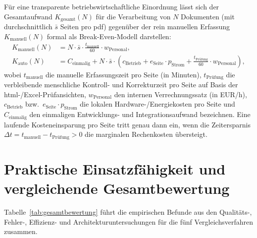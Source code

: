 Für eine transparente betriebswirtschaftliche Einordnung lässt sich der Gesamtaufwand $K_{\text{gesamt}}(N)$ für die Verarbeitung von $N$ Dokumenten (mit durchschnittlich $\bar{s}$ Seiten pro \ac{pdf}) gegenüber der rein manuellen Erfassung $K_{\text{manuell}}(N)$ formal als Break-Even-Modell darstellen:
\begin{align}
  K_{\text{manuell}}(N) &= N \cdot \bar{s} \cdot \frac{t_{\text{manuell}}}{60} \cdot w_{\text{Personal}}, \label{eq:kosten-manuell} \\
  K_{\text{auto}}(N) &= C_{\text{einmalig}} + N \cdot \bar{s} \cdot \left( c_{\text{Betrieb}} + e_{\text{Seite}} \cdot p_{\text{Strom}} + \frac{t_{\text{Prüfung}}}{60} \cdot w_{\text{Personal}} \right), \label{eq:kosten-auto}
\end{align}
wobei $t_{\text{manuell}}$ die manuelle Erfassungszeit pro Seite (in Minuten), $t_{\text{Prüfung}}$ die verbleibende menschliche Kontroll- und Korrekturzeit pro Seite auf Basis der \ac{html}-/Excel-Prüfansichten, $w_{\text{Personal}}$ den internen Verrechnungssatz (in EUR/h), $c_{\text{Betrieb}}$ bzw.\ $e_{\text{Seite}} \cdot p_{\text{Strom}}$ die lokalen Hardware-/Energiekosten pro Seite und $C_{\text{einmalig}}$ den einmaligen Entwicklungs- und Integrationsaufwand bezeichnen. Eine laufende Kosteneinsparung pro Seite tritt genau dann ein, wenn die Zeitersparnis $\Delta t = t_{\text{manuell}} - t_{\text{Prüfung}} > 0$ die marginalen Rechenkosten übersteigt.


\section{Praktische Einsatzfähigkeit und vergleichende Gesamtbewertung}
\label{sec:ergebnisse-gesamtbewertung}

Tabelle~\ref{tab:gesamtbewertung} führt die empirischen Befunde aus den Qualitäts-, Fehler-, Effizienz- und Architekturuntersuchungen für die fünf Vergleichsverfahren zusammen.

